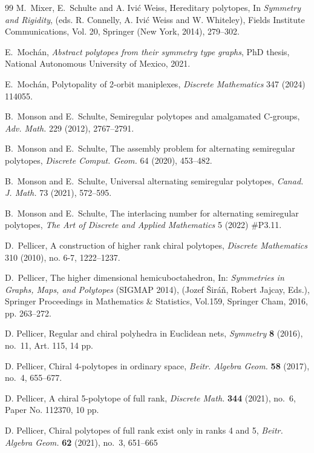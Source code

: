 \documentclass[12pt]{article}
\renewcommand{\>}{\rangle}
\theoremstyle{definition}\newtheorem{definition}{Definition}[section]
\begin{document}
\begin{thebibliography}{99}
M.~Mixer, E.~Schulte and A. Ivi\'{c} Weiss, Hereditary polytopes, In {\em Symmetry and Rigidity\/}, (eds. R. Connelly, A. Ivi\'{c} Weiss and W. Whiteley), Fields Institute Communications, Vol. 20, Springer (New York, 2014), 279--302. 

 E.~Moch\'an, \textit{Abstract polytopes from their symmetry type graphs}, PhD thesis, National Autonomous University of Mexico, 2021.

E.~Moch\'an, Polytopality of 2-orbit maniplexes, \textit{ Discrete Mathematics\/} 347 (2024) 114055.

B.~Monson and E.~Schulte, Semiregular polytopes and amalgamated {C}-groups,
\emph{Adv. Math.} 229 (2012), 2767--2791.

B.~Monson and E.~Schulte, The assembly problem for alternating semiregular
polytopes, \emph{Discrete Comput. Geom.} 64 (2020), 453--482.
 
B.~Monson and E.~Schulte, Universal alternating semiregular polytopes,
\emph{Canad. J. Math.} 73 (2021), 572--595.

B.~Monson and E.~Schulte, The interlacing number for alternating semiregular polytopes, \textit{The Art of Discrete and Applied Mathematics} 5 (2022) \#P3.11.

D.~Pellicer, A construction of higher rank chiral polytopes, \textit{Discrete Mathematics\/} 310 (2010), no. 6-7, 1222--1237.

D.~Pellicer, The higher dimensional hemicuboctahedron, In: \textit{Symmetries in Graphs, Maps, and Polytopes} (SIGMAP 2014), (Jozef \v{S}ir\'{a}\v{n}, Robert Jajcay, Eds.), Springer Proceedings in Mathematics \& Statistics, Vol.159, Springer Cham, 2016, pp. 263--272.

D. Pellicer, Regular and chiral polyhedra in Euclidean nets, \textit{Symmetry} {\bf 8} (2016), no.~11, Art. 115, 14 pp.

D. Pellicer, Chiral 4-polytopes in ordinary space, \textit{Beitr. Algebra Geom.} {\bf 58} (2017), no.~4, 655--677.

D. Pellicer, A chiral 5-polytope of full rank, \textit{Discrete Math.} {\bf 344} (2021), no.~6, Paper No. 112370, 10 pp.

D. Pellicer, Chiral polytopes of full rank exist only in ranks 4 and 5, \textit{Beitr. Algebra Geom.} {\bf 62} (2021), no.~3, 651--665


\end{thebibliography}
\end{document}
